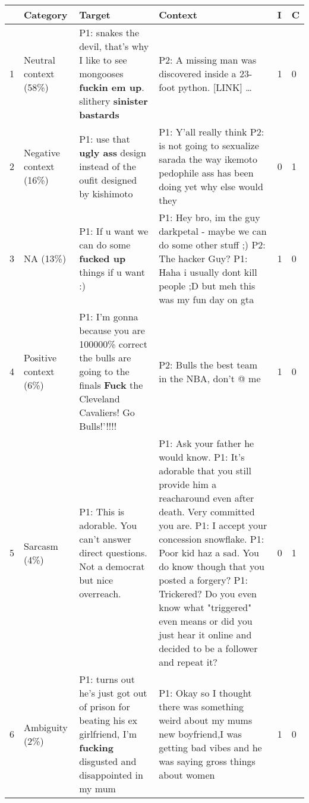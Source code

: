 \documentclass[acmsmall]{acmart}
\begin{document}
\begin{table*}[]
\begin{footnotesize}
\begin{tabular}{p{0.05cm}|l|p{4.5cm}|p{4.5cm}|p{0.05cm}|p{0.05cm}}
\toprule
& \textbf{Category} & \textbf{Target} & \textbf{Context} & {\bf I} & {\bf C} \\ \midrule
1 & Neutral context (58\%) &  P1: snakes the devil, that's why I like to see mongooses \textbf{fuckin em up}. slithery \textbf{sinister bastards}  & P2: A missing man was discovered inside a 23-foot python. [LINK] … & 1 & 0 \\ \hline
2 & Negative context (16\%) & P1: use that \textbf{ugly ass} design instead of the oufit designed by kishimoto & P1: Y'all really think \newline P2: is not going to sexualize sarada the way ikemoto pedophile ass has been doing yet why else would they~ & 0 & 1 \\ \hline
3 & NA (13\%) & P1: If u want we can do some \textbf{fucked up} things if u want :)  & P1: Hey bro, im the guy darkpetal - maybe we can do some other stuff ;) \newline P2: The hacker Guy? \newline P1: Haha i usually dont kill people ;D but meh this was my fun day on gta & 1 & 0 \\ \hline
4 & Positive context (6\%) & P1: I'm gonna \@ because you are 100000\% correct the bulls are going to the finals \textbf{Fuck} the Cleveland Cavaliers! Go Bulls!'!!!! & P2: Bulls the best team in the NBA, don't @ me & 1 & 0 \\ \hline
5 & Sarcasm (4\%) & P1: This is adorable. You can't answer direct questions. Not a democrat but nice overreach. & P1: Ask your father he would know. \newline P1: It's adorable that you still provide him a reacharound even after death. Very committed you are. \newline P1: I accept your concession snowflake. \newline P1: Poor kid haz a sad. You do know though that you posted a forgery? \newline P1: Trickered? Do you even know what "triggered" even means or did you just hear it online and decided to be a follower and repeat it? & 0 & 1 \\ \hline
6 & Ambiguity (2\%) & P1: turns out he's just got out of prison for beating his ex girlfriend, I'm \textbf{fucking} disgusted and disappointed in my mum & P1: Okay so I thought there was something weird about my mums new boyfriend,I was getting bad vibes and he was saying gross things about women & 1 & 0 \\ \hline

\end{tabular}
\end{footnotesize}
\end{table*}
\end{document}
